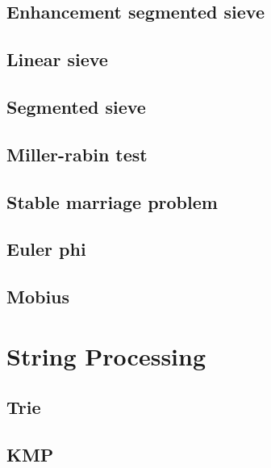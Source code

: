 \subsection{Enhancement segmented sieve}
\raggedbottom
\hrulefill
\subsection{Linear sieve}
\raggedbottom
\hrulefill
\subsection{Segmented sieve}
\raggedbottom
\hrulefill
\subsection{Miller-rabin test}
\raggedbottom
\hrulefill
\subsection{Stable marriage problem}
\raggedbottom
\hrulefill
\subsection{Euler phi}
\raggedbottom
\hrulefill
\subsection{Mobius}
\raggedbottom
\hrulefill


\section{String Processing}
\subsection{Trie}
\raggedbottom
\hrulefill
\subsection{KMP}
\raggedbottom
\hrulefill


